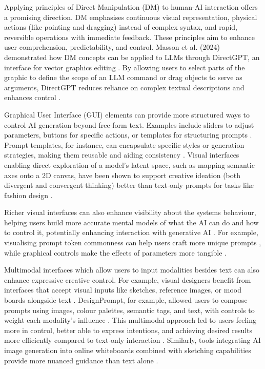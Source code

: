 Applying principles of Direct Manipulation (DM) \cite{Shneiderman1997-pu, Shneiderman1997-tv} to human-AI interaction offers a promising direction. DM emphasises continuous visual representation, physical actions (like pointing and dragging) instead of complex syntax, and rapid, reversible operations with immediate feedback. These principles aim to enhance user comprehension, predictability, and control. Masson et al. (2024) demonstrated how DM concepts can be applied to LLMs through DirectGPT, an interface for vector graphics editing \cite{Masson2024-nt}. By allowing users to select parts of the graphic to define the scope of an LLM command or drag objects to serve as arguments, DirectGPT reduces reliance on complex textual descriptions and enhances control \cite{Masson2024-nt}. 

Graphical User Interface (GUI) elements can provide more structured ways to control AI generation beyond free-form text. Examples include sliders to adjust parameters, buttons for specific actions, or templates for structuring prompts \cite{Ding2024-ta, Chang2023-tv, Moruzzi2024-cq}. Prompt templates, for instance, can encapsulate specific styles or generation strategies, making them reusable and aiding consistency \cite{Chang2023-tv}. Visual interfaces enabling direct exploration of a model's latent space, such as mapping semantic axes onto a 2D canvas, have been shown to support creative ideation (both divergent and convergent thinking) better than text-only prompts for tasks like fashion design \cite{Davis2024-ml}. 

Richer visual interfaces can also enhance visibility about the systems behaviour, helping users build more accurate mental models of what the AI can do and how to control it, potentially enhancing interaction with generative AI \cite{Weisz2024-io, Amershi2019-vy}. For example, visualising prompt token commonness can help users craft more unique prompts \cite{Chang2023-tv}, while graphical controls make the effects of parameters more tangible \cite{Davis2024-ml}. 

Multimodal interfaces which allow users to input modalities besides text can also enhance expressive creative control. For example, visual designers benefit from interfaces that accept visual inputs like sketches, reference images, or mood boards alongside text \cite{Park2024-gw, Peng2024-tr}. DesignPrompt, for example, allowed users to compose prompts using images, colour palettes, semantic tags, and text, with controls to weight each modality's influence \cite{Peng2024-tr}. This multimodal approach led to users feeling more in control, better able to express intentions, and achieving desired results more efficiently compared to text-only interaction \cite{Peng2024-tr}. Similarly, tools integrating AI image generation into online whiteboards combined with sketching capabilities provide more nuanced guidance than text alone \cite{Verheijden2023-gn}.

